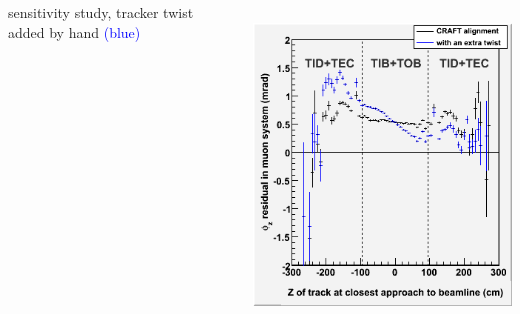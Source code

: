 \documentclass[compress]{beamer}
\begin{document}
\begin{frame}
\begin{columns}

sensitivity study, tracker twist added by hand \textcolor{blue}{(blue)}

\mbox{ } \hfill \includegraphics[width=0.7\linewidth]{phiresid_from_tracker_inner_twist2.png} \hfill \mbox{ }

\end{columns}
\end{frame}
\end{document}
